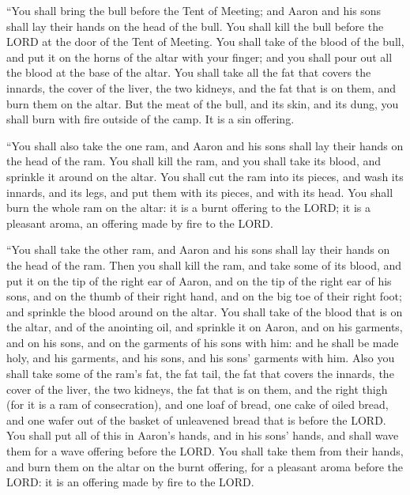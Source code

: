 \myverse{}“You shall bring the bull before the Tent of Meeting; and Aaron
and his sons shall lay their hands on the head of the bull.
\myverse{}You shall kill the bull before the LORD at the door of the Tent of Meeting.
\myverse{}You shall take of the blood of the bull, and put it on the horns of the altar
with your finger; and you shall pour out all the blood at the base of the altar.
\myverse{}You shall take all the fat that covers the innards, the cover of the liver,
the two kidneys, and the fat that is on them, and burn them on the altar.
\myverse{}But the meat of the bull, and its skin, and its dung, you shall burn with
fire outside of the camp. It is a sin offering.


\myverse{}“You shall also take the one ram, and Aaron and his sons shall
lay their hands on the head of the ram.
\myverse{}You shall kill the ram, and you shall take its blood, and sprinkle it around
on the altar.
\myverse{}You shall cut the ram into its pieces, and wash its innards, and its legs,
and put them with its pieces, and with its head.
\myverse{}You shall burn the whole ram on the altar: it is a burnt offering to the
LORD; it is a pleasant aroma, an offering made by fire to the LORD.


\myverse{}“You shall take the other ram, and Aaron and his sons shall
lay their hands on the head of the ram.
\myverse{}Then you shall kill the ram, and take some of its blood, and put it on the
tip of the right ear of Aaron, and on the tip of the right ear of his sons, and on the thumb of their
right hand, and on the big toe of their right foot; and sprinkle the blood around on the altar.
\myverse{}You shall take of the blood that is on the altar, and of the anointing oil,
and sprinkle it on Aaron, and on his garments, and on his sons, and on the garments of his sons with him:
and he shall be made holy, and his garments, and his sons, and his sons’ garments with him.
\myverse{}Also you shall take some of the ram’s fat, the fat tail, the fat that covers
the innards, the cover of the liver, the two kidneys, the fat that is on them, and the right thigh (for
it is a ram of consecration),
\myverse{}and one loaf of bread, one cake of oiled bread, and one wafer out of the
basket of unleavened bread that is before the LORD.
\myverse{}You shall put all of this in Aaron’s hands, and in his sons’ hands, and shall
wave them for a wave offering before the LORD.
\myverse{}You shall take them from their hands, and burn them on the altar on the burnt
offering, for a pleasant aroma before the LORD: it is an offering made by fire to the LORD.


